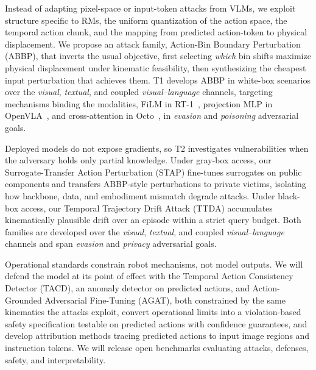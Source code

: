 \documentclass[11pt,letterpaper]{article}
\begin{document}
Instead of adapting pixel-space or input-token attacks from VLMs, we exploit structure specific to RMs, \ie the uniform
quantization of the action space, the temporal action chunk, and the mapping from predicted action-token to
physical displacement. We propose an attack family, Action-Bin Boundary Perturbation (ABBP), that inverts the usual objective, first selecting \emph{which} bin shifts maximize physical displacement under kinematic feasibility, then synthesizing the cheapest input perturbation that achieves them. %
T1 develops ABBP in white-box scenarios over the \emph{visual}, \emph{textual}, and coupled \emph{visual--language} channels, targeting mechanisms binding the modalities, \eg FiLM in RT-1~\cite{rt-1}, projection MLP in OpenVLA~\cite{kim2024openvla}, and cross-attention in Octo~\cite{team2024octo}, in \emph{evasion} and \emph{poisoning} adversarial goals.

 Deployed models do not expose gradients, so T2 investigates vulnerabilities when the adversary holds only partial knowledge. Under gray-box access, our Surrogate-Transfer Action Perturbation (STAP) fine-tunes surrogates on public components and transfers ABBP-style perturbations to private victims, isolating how backbone, data, and embodiment mismatch degrade attacks. Under black-box access, our Temporal Trajectory Drift Attack (TTDA) accumulates kinematically plausible drift over an episode within a strict query budget. Both families are developed over the \emph{visual}, \emph{textual}, and coupled \emph{visual--language} channels and span \emph{evasion} and \emph{privacy} adversarial goals. %

 Operational standards constrain robot mechanisms, not model outputs. We will defend the model at its point of effect with the Temporal Action Consistency Detector (TACD), an anomaly detector on predicted actions, and Action-Grounded Adversarial Fine-Tuning (AGAT), both constrained by the same kinematics the attacks exploit, convert operational limits into a violation-based safety specification testable on predicted actions with confidence guarantees, and develop attribution methods
tracing predicted actions to input image regions and instruction tokens. We will release open benchmarks evaluating attacks, defenses, safety, and interpretability.
\end{document}
